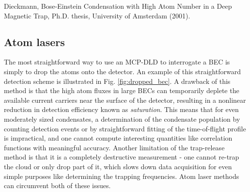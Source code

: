 	Dieckmann, Bose-Einstein Condensation with High Atom Number in a Deep Magnetic Trap, Ph.D.
	thesis, University of Amsterdam (2001).
\subsection*{Atom lasers}



	The most straightforward way to use an MCP-DLD to interrogate a BEC is simply to drop the atoms onto the detector.
	An example of this straightforward detection scheme is illustrated in Fig.
	\ref{fig:dropped_bec}.
	A drawback of this method is that the high atom fluxes in large BECs can temporarily deplete the available current carriers near the surface of the detector, resulting in a nonlinear reduction in detection efficiency known as \emph{saturation}.
	This means that for even moderately sized condensates, a determination of the condensate population by counting detection events or by straightforward fitting of the time-of-flight profile is impractical, and one cannot compute interesting quantities like correlation functions with meaningful accuracy.
	Another limitation of the trap-release method is that it is a completely destructive measurement - one cannot re-trap the cloud or only drop part of it, which slows down data acquisition for even simple purposes like determining the trapping frequencies.
	Atom laser methods can circumvent both of these issues.
	
